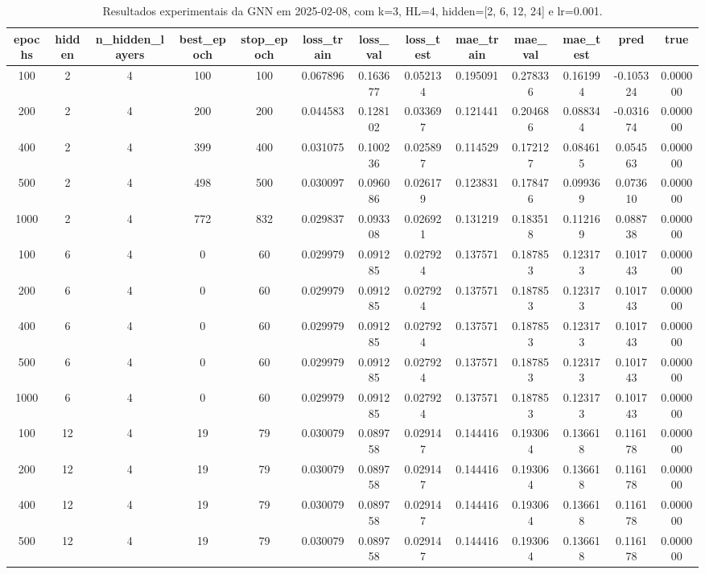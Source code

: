 \begin{table}[h]
\centering
\caption{Resultados experimentais da GNN em 2025-02-08, com k=3, HL=4, hidden=[2, 6, 12, 24] e lr=0.001.}
\label{tab:gnn_results_k3_hl4_d20250208}
\begin{tabular}{ccccccccccccc}
\toprule
epochs & hidden & n\_hidden\_layers & best\_epoch & stop\_epoch & loss\_train & loss\_val & loss\_test & mae\_train & mae\_val & mae\_test & pred & true \\
\midrule
100 & 2 & 4 & 100 & 100 & 0.067896 & 0.163677 & 0.052134 & 0.195091 & 0.278336 & 0.161994 & -0.105324 & 0.000000 \\
200 & 2 & 4 & 200 & 200 & 0.044583 & 0.128102 & 0.033697 & 0.121441 & 0.204686 & 0.088344 & -0.031674 & 0.000000 \\
400 & 2 & 4 & 399 & 400 & 0.031075 & 0.100236 & 0.025897 & 0.114529 & 0.172127 & 0.084615 & 0.054563 & 0.000000 \\
500 & 2 & 4 & 498 & 500 & 0.030097 & 0.096086 & 0.026179 & 0.123831 & 0.178476 & 0.099369 & 0.073610 & 0.000000 \\
1000 & 2 & 4 & 772 & 832 & 0.029837 & 0.093308 & 0.026921 & 0.131219 & 0.183518 & 0.112169 & 0.088738 & 0.000000 \\
100 & 6 & 4 & 0 & 60 & 0.029979 & 0.091285 & 0.027924 & 0.137571 & 0.187853 & 0.123173 & 0.101743 & 0.000000 \\
200 & 6 & 4 & 0 & 60 & 0.029979 & 0.091285 & 0.027924 & 0.137571 & 0.187853 & 0.123173 & 0.101743 & 0.000000 \\
400 & 6 & 4 & 0 & 60 & 0.029979 & 0.091285 & 0.027924 & 0.137571 & 0.187853 & 0.123173 & 0.101743 & 0.000000 \\
500 & 6 & 4 & 0 & 60 & 0.029979 & 0.091285 & 0.027924 & 0.137571 & 0.187853 & 0.123173 & 0.101743 & 0.000000 \\
1000 & 6 & 4 & 0 & 60 & 0.029979 & 0.091285 & 0.027924 & 0.137571 & 0.187853 & 0.123173 & 0.101743 & 0.000000 \\
100 & 12 & 4 & 19 & 79 & 0.030079 & 0.089758 & 0.029147 & 0.144416 & 0.193064 & 0.136618 & 0.116178 & 0.000000 \\
200 & 12 & 4 & 19 & 79 & 0.030079 & 0.089758 & 0.029147 & 0.144416 & 0.193064 & 0.136618 & 0.116178 & 0.000000 \\
400 & 12 & 4 & 19 & 79 & 0.030079 & 0.089758 & 0.029147 & 0.144416 & 0.193064 & 0.136618 & 0.116178 & 0.000000 \\
500 & 12 & 4 & 19 & 79 & 0.030079 & 0.089758 & 0.029147 & 0.144416 & 0.193064 & 0.136618 & 0.116178 & 0.000000 \\

\end{tabular}
\end{table}
